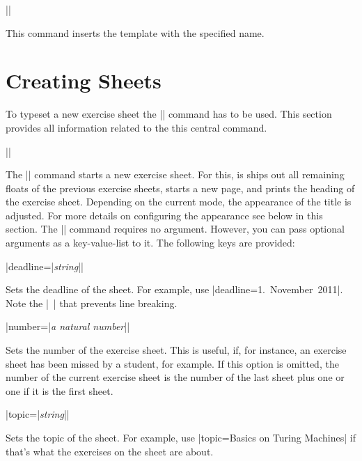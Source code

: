 \documentclass[a4paper,fleqn]{report}
\def\syntaxdefaultarg#1{\hfill\texttt{\small #1}\par\smallskip\noindent\ignorespaces}
\def\metaargument#1{\textit{\small #1}}
\begin{document}
\begin{syntax}
  |\usesheettemplate{|\metaargument{template name}|}|
  \syntaxdefaultarg{}
  This command inserts the template with the specified name.
\end{syntax}

\section{Creating Sheets}

To typeset a new exercise sheet the |\sheet| command has to be used.
This section provides all information related to the this central
command.

\begin{syntax}

  |\sheet[|\metaargument{key-value-list}|]| \syntaxdefaultarg{} The
  |\sheet| command starts a new exercise sheet. For this, is ships out
  all remaining floats of the previous exercise sheets, starts a new
  page, and prints the heading of the exercise sheet. Depending on the
  current mode, the appearance of the title is adjusted. For more
  details on configuring the appearance see below in this section.
  The |\sheet| command requires no argument. However, you can pass
  optional arguments as a key-value-list to it. The following keys are
  provided:
  \begin{syntax}
    |deadline={|\metaargument{string}|}| \syntaxdefaultarg{}
    Sets the deadline of the sheet. For example, use 
    |deadline={1.~November~2011}|. Note the |~| that prevents line
    breaking.
  \end{syntax}
  \begin{syntax}
    |number={|\metaargument{a natural number}|}| \syntaxdefaultarg{}
    Sets the number of the exercise sheet. This is useful, if, for
    instance, an exercise sheet has been missed by a student, for
    example. If this option is omitted, the number of the current
    exercise sheet is the number of the last sheet plus one or one if
    it is the first sheet.
  \end{syntax}
  \begin{syntax}
    |topic={|\metaargument{string}|}| \syntaxdefaultarg{}
    Sets the topic of the sheet. For example, use 
    |topic={Basics on Turing Machines}| if that's what the exercises
    on the sheet are about.
  \end{syntax}
\end{syntax}
\end{document}
